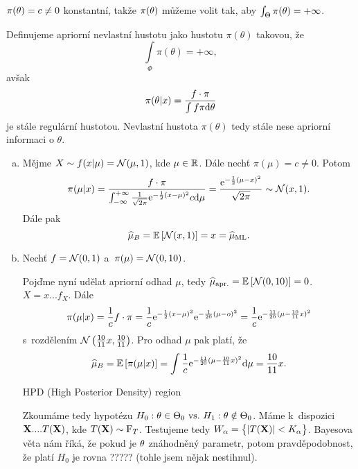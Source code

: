 

$\pi(\theta)=c\neq0$ konstantní, takže $\pi(\theta)$ můžeme volit tak, aby $\int_\Theta\pi(\theta)=+\infty$.
\begin{define} Definujeme apriorní nevlastní hustotu jako hustotu $\pi(\theta)$ takovou, že $$ \int\limits_{\Phi}{\pi(\theta)} = +\infty,$$  avšak 
	$$\pi(\theta|x)=\frac{f\cdot \pi}{\int f\pi\mathrm{d}\theta}$$ je stále regulární hustotou. Nevlastní hustota $\pi(\theta)$ tedy stále nese apriorní informaci o $\theta$.
\end{define}
\begin{example}\begin{enumerate}[a)]
		\item 
	Mějme $X\sim f(x|\mu)=\mathcal{N}(\mu,1)$, kde $\mu\in\mathbb{R}$. Dále nechť $\pi(\mu)=c\neq0$. Potom$$ \pi(\mu|x)=\frac{f\cdot \pi}{\int_{-\infty}^{+\infty}\frac{1}{\sqrt{2\pi}}\mathrm{e}^{-\frac{1}{2}(x-\mu)^2}c\mathrm{d}\mu}=\frac{\mathrm{e}^{-\frac{1}{2}(\mu-x)^2}}{\sqrt{2\pi}}\sim\mathcal{N}(x,1).$$
	Dále pak 
	$$\widehat{\mu}_B=\mathbb{E}\left[ \mathcal{N}(x,1) \right]=x=\widehat{\mu}_{\mathrm{ML}}.$$
	\item Nechť $f=\mathcal{N}(0,1)$ a~$\pi(\mu)=\mathcal{N}(0,10)$.
	
	
	
	Pojďme nyní udělat apriorní odhad $\mu$, tedy $\widehat{\mu}_{\mathrm{apr.}}=\mathbb{E}\left[ \mathcal{N}(0,10) \right]=0$. $X=x...f_X$. Dále
	$$ \pi(\mu|x)=\frac{1}{c}f\cdot\pi=\frac{1}{c}\mathrm{e}^{-\frac{1}{2}(x-\mu)^2}\mathrm{e}^{-\frac{1}{20}(\mu-o)^2}=\frac{1}{c}\mathrm{e}^{-\frac{11}{20}(\mu-\frac{10}{11}x)^2}$$ s~rozdělením $\mathcal{N}\left(\frac{10}{11}x,\frac{10}{11}\right)$.
	Pro odhad $\mu$ pak platí, že
	$$\widehat{\mu}_B=\mathbb{E}\left[ \pi(\mu|x) \right]=\int\frac{1}{c}\mathrm{e}^{-\frac{11}{20}(\mu-\frac{10}{11}x)^2}\mathrm{d}\mu=\frac{10}{11}x.$$ 
	
	HPD (High Posterior Density) region
	
	
	
	Zkoumáme tedy hypotézu $H_0: \theta\in\Theta_0 ~\text{vs.}~ H_1: \theta\notin\Theta_0$. Máme k~dispozici $\textbf{X}....T(\textbf{X})$, kde $T(\textbf{X})\sim\mathrm{F}_T$. Testujeme tedy $W_\alpha=\big\{ |T(\textbf{X})|<K_\alpha \big\}$. Bayesova věta nám říká, že pokud je $\theta$ znáhodněný parametr, potom pravděpodobnost, že platí $H_0$ je rovna ????? (tohle jsem nějak nestihnul).
	\end{enumerate}
\end{example}
